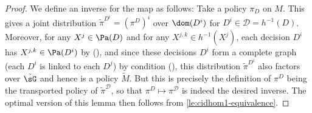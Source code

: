 \begin{proof}
We define an inverse for the map as follows: Take a policy $\pi_D$ on $M$.
This gives a joint distribution $\tilde \pi^{D^i}=(\pi^{D})^i$ over $\dom(D^i)$ for $D^i\in \mathcal D=h^{-1}(D)$. Moreover, for any $X^j\in \Pa(D)$ and for any $X^{j,k}\in h^{-1}(X^j)$,  each decision $D^i$ has $X^{j,k}\in \Pa(D^i)$  by (\coversallinfolinks), and since these decisions $D^i$ form a complete graph (each $D^i$ is linked to each $D^j$) 
by condition (\combinesonlylinkeddecisions), this distribution $\tilde \pi^{D^i}$ also factors over $\tilde \sG$ and hence is a policy $\tilde M$. But this is precisely the definition of $\pi^D$ being the transported policy of $\tilde \pi^{\mathcal D}$, so that $\pi^D \mapsto \pi^{\mathcal D}$ is indeed the desired inverse. The optimal version of this lemma then follows from \cref{le:cidhom1-equivalence}.
\end{proof}









\lecidhompreservesmateriality*

